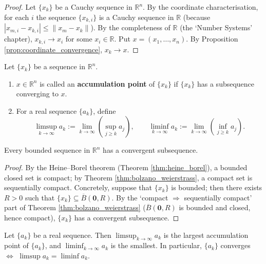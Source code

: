 \begin{proof}
Let $\{x_k\}$ be a Cauchy sequence in $\mathbb{R}^n$. By the coordinate characterisation, for each $i$ the sequence $\{x_{k,i}\}$ is a Cauchy sequence in $\mathbb{R}$ (because $|x_{m,i} - x_{k,i}| \le \|x_m - x_k\|$). By the completeness of $\mathbb{R}$ (the `Number Systems' chapter), $x_{k,i} \to x_i$ for some $x_i \in \mathbb{R}$. Put $x = (x_1, \dots, x_n)$. By Proposition \ref{prop:coordinate_convergence}, $x_k \to x$.
\end{proof}

\begin{definition}\label{def:cluster_upper_lower_limit}
Let $\{x_k\}$ be a sequence in $\mathbb{R}^n$.
\begin{enumerate}[label=(\roman*)]
    \item $x \in \mathbb{R}^n$ is called an \textbf{accumulation point} of $\{x_k\}$ if $\{x_k\}$ has a subsequence converging to $x$.
    \item For a real sequence $\{a_k\}$, define
    \[
    \limsup_{k \to \infty} a_k := \lim_{k \to \infty} \left( \sup_{j \ge k} a_j \right), \qquad \liminf_{k \to \infty} a_k := \lim_{k \to \infty} \left( \inf_{j \ge k} a_j \right).
    \]
\end{enumerate}
\end{definition}

\begin{theorem}\label{thm:bolzano_weierstrass_seq}
Every bounded sequence in $\mathbb{R}^n$ has a convergent subsequence.
\end{theorem}

\begin{proof}
By the Heine--Borel theorem (Theorem \ref{thm:heine_borel}), a bounded closed set is compact; by Theorem \ref{thm:bolzano_weierstrass}, a compact set is sequentially compact. Concretely, suppose that $\{x_k\}$ is bounded; then there exists $R > 0$ such that $\{x_k\} \subseteq \overline{B}(\mathbf{0}, R)$. By the `compact $\Rightarrow$ sequentially compact' part of Theorem \ref{thm:bolzano_weierstrass} ($\overline{B}(\mathbf{0}, R)$ is bounded and closed, hence compact), $\{x_k\}$ has a convergent subsequence.
\end{proof}

\begin{proposition}\label{prop:limsup_cluster}
Let $\{a_k\}$ be a real sequence. Then $\limsup_{k \to \infty} a_k$ is the largest accumulation point of $\{a_k\}$, and $\liminf_{k \to \infty} a_k$ is the smallest. In particular, $\{a_k\}$ converges $\iff$ $\limsup a_k = \liminf a_k$.
\end{proposition}

